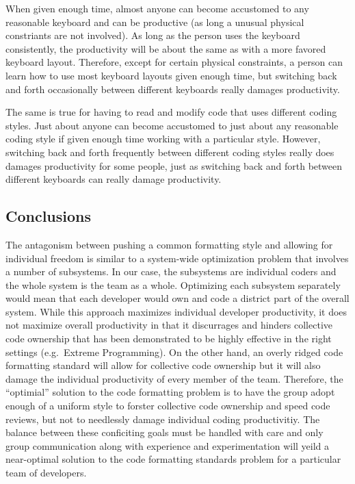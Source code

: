 When given enough time, almost anyone can become accustomed to any reasonable
keyboard and can be productive (as long a unusual physical constriants are not
involved).  As long as the person uses the keyboard consistently, the
productivity will be about the same as with a more favored keyboard layout.
Therefore, except for certain physical constraints, a person can learn how to
use most keyboard layouts given enough time, but switching back and forth
occasionally between different keyboards really damages productivity.

The same is true for having to read and modify code that uses different coding
styles.  Just about anyone can become accustomed to just about any reasonable
coding style if given enough time working with a particular style.  However,
switching back and forth frequently between different coding styles really
does damages productivity for some people, just as switching back and forth
between different keyboards can really damage productivity.

%
\subsection{Conclusions}
%

The antagonism between pushing a common formatting style and allowing for
individual freedom is similar to a system-wide optimization problem that
involves a number of subsystems.  In our case, the subsystems are individual
coders and the whole system is the team as a whole.  Optimizing each subsystem
separately would mean that each developer would own and code a district part
of the overall system.  While this approach maximizes individual developer
productivity, it does not maximize overall productivity in that it discurrages
and hinders collective code ownership that has been demonstrated to be highly
effective in the right settings (e.g.\ Extreme Programming).  On the other
hand, an overly ridged code formatting standard will allow for collective code
ownership but it will also damage the individual productivity of every member
of the team.  Therefore, the ``optimial'' solution to the code formatting
problem is to have the group adopt enough of a uniform style to forster
collective code ownership and speed code reviews, but not to needlessly damage
individual coding productivitiy.  The balance between these conficiting goals
must be handled with care and only group communication along with experience
and experimentation will yeild a near-optimal solution to the code formatting
standards problem for a particular team of developers.

